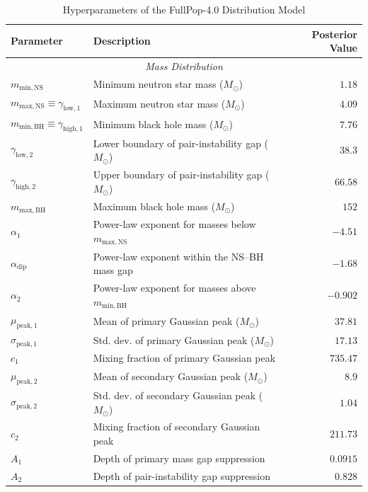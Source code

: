 \begin{table}[htb]
\renewcommand\arraystretch{1.08}
\setlength{\tabcolsep}{16pt}
\centering
\caption{Hyperparameters of the FullPop-4.0 Distribution Model}
\label{tab:hyperparams}
\begin{tabular}{llr}
\toprule
\textbf{Parameter} & \textbf{Description} & \textbf{Posterior Value} \\
\midrule
\multicolumn{3}{c}{\textit{Mass Distribution}} \\
\midrule
$m_{\mathrm{min,NS}}$ & Minimum neutron star mass ($M_\odot$) & $1.18$ \\
$m_{\mathrm{max,NS}} \equiv \gamma_{\mathrm{low},1}$ & Maximum neutron star mass ($M_\odot$) & $4.09$ \\
$m_{\mathrm{min,BH}} \equiv \gamma_{\mathrm{high},1}$ & Minimum black hole mass ($M_\odot$) & $7.76$ \\
$\gamma_{\mathrm{low},2}$  & Lower boundary of pair-instability gap ($M_\odot$) & $38.3$ \\
$\gamma_{\mathrm{high},2}$ & Upper boundary of pair-instability gap ($M_\odot$) & $66.58$ \\
$m_{\mathrm{max,BH}}$ & Maximum black hole mass ($M_\odot$) & $152$ \\
\midrule
$\alpha_1$ & Power-law exponent for masses below $m_{\mathrm{max,NS}}$ & $-4.51$ \\
$\alpha_{\mathrm{dip}}$ & Power-law exponent within the NS–BH mass gap & $-1.68$ \\
$\alpha_2$ & Power-law exponent for masses above $m_{\mathrm{min,BH}}$ & $-0.902$ \\
\midrule
$\mu_{\mathrm{peak},1}$ & Mean of primary Gaussian peak ($M_\odot$) & $37.81$ \\
$\sigma_{\mathrm{peak},1}$ & Std. dev. of primary Gaussian peak ($M_\odot$) & $17.13$ \\
$c_1$ & Mixing fraction of primary Gaussian peak & $735.47$ \\
$\mu_{\mathrm{peak},2}$ & Mean of secondary Gaussian peak ($M_\odot$) & $8.9$ \\
$\sigma_{\mathrm{peak},2}$ & Std. dev. of secondary Gaussian peak ($M_\odot$) & $1.04$ \\
$c_2$ & Mixing fraction of secondary Gaussian peak & $211.73$ \\
\midrule
$A_1$ & Depth of primary mass gap suppression & $0.0915$ \\
$A_2$ & Depth of pair-instability gap suppression & $0.828$ \\


\end{tabular}
\end{table}
